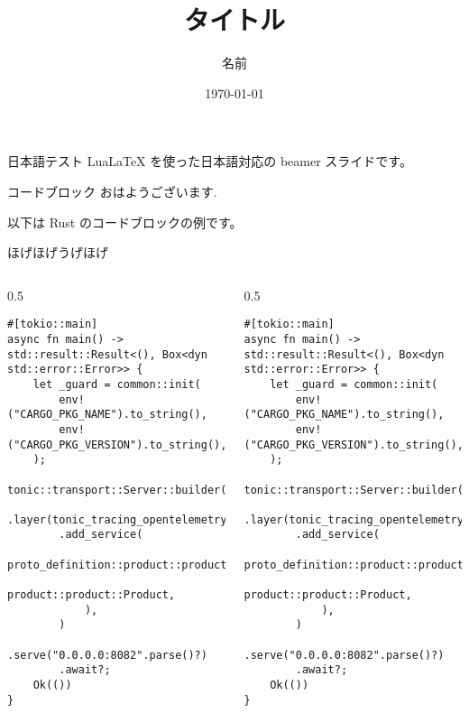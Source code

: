 \documentclass[aspectratio=169]{beamer}
\title{タイトル}
\author{名前}
\institute{所属}
\date{\today}   %
\begin{document}
\frame{\titlepage}

\begin{frame}{日本語テスト}
    LuaLaTeX を使った日本語対応の beamer スライドです。
\end{frame}

\begin{frame}[fragile]{コードブロック}
    おはようございます. \par
    以下は Rust のコードブロックの例です。\par
    ほげほげうげほげ\par

    \lstset{basicstyle=\tiny}

    \begin{columns}
        \begin{column}{0.5\linewidth}
            \begin{lstlisting}
#[tokio::main]
async fn main() -> std::result::Result<(), Box<dyn std::error::Error>> {
    let _guard = common::init(
        env!("CARGO_PKG_NAME").to_string(),
        env!("CARGO_PKG_VERSION").to_string(),
    );
    tonic::transport::Server::builder()
        .layer(tonic_tracing_opentelemetry::middleware::server::OtelGrpcLayer::default())
        .add_service(
            proto_definition::product::product_service_server::ProductServiceServer::new(
                product::product::Product,
            ),
        )
        .serve("0.0.0.0:8082".parse()?)
        .await?;
    Ok(())
}

\end{lstlisting}
        \end{column}
        \begin{column}{0.5\linewidth}
            \begin{lstlisting}
#[tokio::main]
async fn main() -> std::result::Result<(), Box<dyn std::error::Error>> {
    let _guard = common::init(
        env!("CARGO_PKG_NAME").to_string(),
        env!("CARGO_PKG_VERSION").to_string(),
    );
    tonic::transport::Server::builder()
        .layer(tonic_tracing_opentelemetry::middleware::server::OtelGrpcLayer::default())
        .add_service(
            proto_definition::product::product_service_server::ProductServiceServer::new(
                product::product::Product,
            ),
        )
        .serve("0.0.0.0:8082".parse()?)
        .await?;
    Ok(())
}

            \end{lstlisting}
        \end{column}
    \end{columns}

\end{frame}
\end{document}
